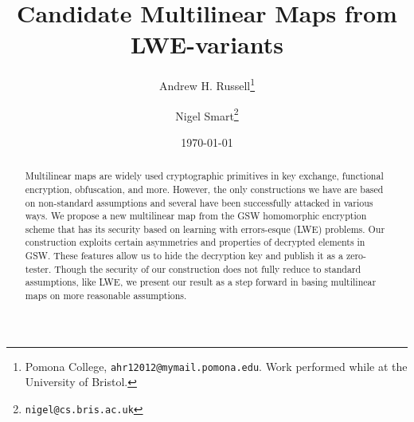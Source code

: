 \documentclass[11pt]{article}
\title{Candidate Multilinear Maps from LWE-variants}
\author{Andrew H. Russell\thanks{Pomona College, \texttt{ahr12012@mymail.pomona.edu}.  Work performed while at the University of Bristol.} \and Nigel Smart\thanks{\texttt{nigel@cs.bris.ac.uk}}}
\date{\today}
\begin{document}
\maketitle
\begin{abstract}
Multilinear maps are widely used cryptographic primitives in key exchange, functional encryption, obfuscation, and more.  However, the only constructions we have are based on non-standard assumptions and several have been successfully attacked in various ways.  We propose a new multilinear map from the GSW homomorphic encryption scheme that has its security based on learning with errors-esque (LWE) problems.  Our construction exploits certain asymmetries and properties of decrypted elements in GSW.  These features allow us to hide the decryption key and publish it as a zero-tester. Though the security of our construction does not fully reduce to standard assumptions, like LWE, we present our result as a step forward in basing multilinear maps on more reasonable assumptions.
\end{abstract}







\newpage

%
%




\end{document}

